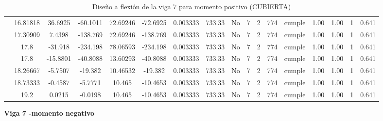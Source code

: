 \begin{table}[H]
{\begin{tabular}{|c|c|c|c|c|c|c|c|c|c|c|c|c|c|c|c|c|}
\cline{2-17}    & 16.81818 & 36.6925 & -60.1011 & 72.69246 & -72.6925 & 0.003333 & 733.33 & No  & 7   & 2   & 774 & \cellcolor[rgb]{ .776,  .937,  .808}cumple & 1.00 & 1.00 & 1   & 0.641 \bigstrut\\
\cline{2-17}    & 17.30909 & 7.4398 & -138.769 & 72.69246 & -138.769 & 0.003333 & 733.33 & No  & 7   & 2   & 774 & \cellcolor[rgb]{ .776,  .937,  .808}cumple & 1.00 & 1.00 & 1   & 0.641 \bigstrut\\
\cline{2-17}    & \cellcolor[rgb]{ .851,  .882,  .949}17.8 & -31.918 & -234.198 & 78.06593 & -234.198 & 0.003333 & 733.33 & No  & 7   & 2   & 774 & \cellcolor[rgb]{ .776,  .937,  .808}cumple & 1.00 & 1.00 & 1   & 0.641 \bigstrut\\
\cline{2-17}    & \cellcolor[rgb]{ .851,  .882,  .949}17.8 & -15.8801 & -40.8088 & 13.60293 & -40.8088 & 0.003333 & 733.33 & No  & 7   & 2   & 774 & \cellcolor[rgb]{ .776,  .937,  .808}cumple & 1.00 & 1.00 & 1   & 0.641 \bigstrut\\
\cline{2-17}    & 18.26667 & -5.7507 & -19.382 & 10.46532 & -19.382 & 0.003333 & 733.33 & No  & 7   & 2   & 774 & \cellcolor[rgb]{ .776,  .937,  .808}cumple & 1.00 & 1.00 & 1   & 0.641 \bigstrut\\
\cline{2-17}    & 18.73333 & -0.4587 & -5.7771 & 10.465 & -10.4653 & 0.003333 & 733.33 & No  & 7   & 2   & 774 & \cellcolor[rgb]{ .776,  .937,  .808}cumple & 1.00 & 1.00 & 1   & 0.641 \bigstrut\\
\cline{2-17}    & 19.2 & 0.0215 & -0.0198 & 10.465 & -10.4653 & 0.003333 & 733.33 & No  & 7   & 2   & 774 & \cellcolor[rgb]{ .776,  .937,  .808}cumple & 1.00 & 1.00 & 1   & 0.641 \bigstrut\\
\hline
\end{tabular}%

  


  }%
    \caption{Diseño a flexión de la viga 7 para momento positivo (CUBIERTA) }
  \label{tab:F VG7 CUB M+}%
\end{table}%
\newpage
\textbf{Viga 7 -momento negativo}
